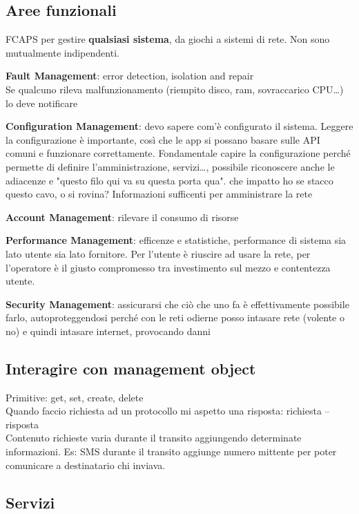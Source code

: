 \documentclass[10pt]{book}
\begin{document}
\subsection{Aree funzionali}
FCAPS per gestire \textbf{qualsiasi sistema}, da giochi a sistemi di rete. Non sono mutualmente indipendenti.
\begin{list}{}{}
	\item \textbf{Fault Management}: error detection, isolation and repair\\
	Se qualcuno rileva malfunzionamento (riempito disco, ram, sovraccarico CPU\ldots) lo deve notificare
	\item \textbf{Configuration Management}: devo sapere com'è configurato il sistema. Leggere la configurazione è importante, così che le app si possano basare sulle API comuni e funzionare correttamente. Fondamentale capire la configurazione perché permette di definire l'amministrazione, servizi\ldots, possibile riconoscere anche le adiacenze e "questo filo qui va su questa porta qua". che impatto ho se stacco questo cavo, o si rovina? Informazioni sufficenti per amministrare la rete
	\item \textbf{Account Management}: rilevare il consumo di risorse
	\item \textbf{Performance Management}: efficenze e statistiche, performance di sistema sia lato utente sia lato fornitore. Per l'utente è riuscire ad usare la rete, per l'operatore è il giusto compromesso tra investimento sul mezzo e contentezza utente.
	\item \textbf{Security Management}: assicurarsi che ciò che uno fa è effettivamente possibile farlo, autoproteggendosi perché con le reti odierne posso intasare rete (volente o no) e quindi intasare internet, provocando danni
\end{list}
\subsection{Interagire con management object}
Primitive: get, set, create, delete\\
Quando faccio richiesta ad un protocollo mi aspetto una risposta: richiesta -- risposta\\
Contenuto richieste varia durante il transito aggiungendo determinate informazioni. Es: SMS durante il transito aggiunge numero mittente per poter comunicare a destinatario chi inviava.
\subsection{Servizi}
\end{document}
